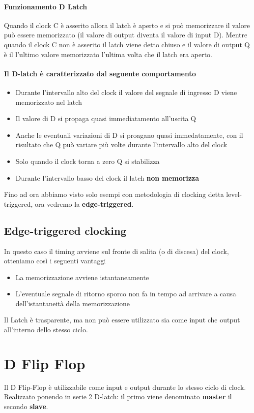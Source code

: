 \documentclass[12pt, a4paper, openany]{book}
\begin{document}
\paragraph{Funzionamento D Latch} Quando il clock C è asserito allora il latch
è aperto e si può memorizzare il valore può essere memorizzato (il valore di output
diventa il valore di input D). Mentre quando il clock C non è asserito il latch viene detto
chiuso e il valore di output Q è il l'ultimo valore memorizzato l'ultima volta
che il latch era aperto.

\paragraph{Il D-latch è caratterizzato dal seguente comportamento}
\begin{itemize}
    \item Durante l'intervallo alto del clock il valore del segnale di ingresso D
    viene memorizzato nel latch
    \item Il valore di D si propaga quasi immediatamento all'uscita Q
    \item Anche le eventuali variazioni di D si proagano quasi immedatamente, con il
    risultato che Q può variare più volte durante l'intervallo alto del clock
    \item Solo quando il clock torna a zero Q si stabilizza
    \item Durante l'intervallo basso del clock il latch \textbf{non memorizza}
\end{itemize}

Fino ad ora abbiamo visto solo esempi con metodologia di clocking detta level-triggered,
ora vedremo la \textbf{edge-triggered}. 
\subsection{Edge-triggered clocking} In questo caso il timing avviene sul fronte di salita
(o di discesa) del clock, otteniamo così i seguenti vantaggi
\begin{itemize}
    \item La memorizzazione avviene istantaneamente
    \item L'eventuale segnale di ritorno sporco non fa in tempo ad arrivare a causa 
    dell'istantaneità della memorizzazione
\end{itemize}
Il Latch è trasparente, ma non può essere utilizzato sia come input che output
all'interno dello stesso ciclo.

\section{D Flip Flop}
Il D Flip-Flop è utilizzabile come input e output durante lo stesso ciclo di clock.
Realizzato ponendo in serie 2 D-latch: il primo viene denominato \textbf{master}
il secondo \textbf{slave}.
\end{document}
